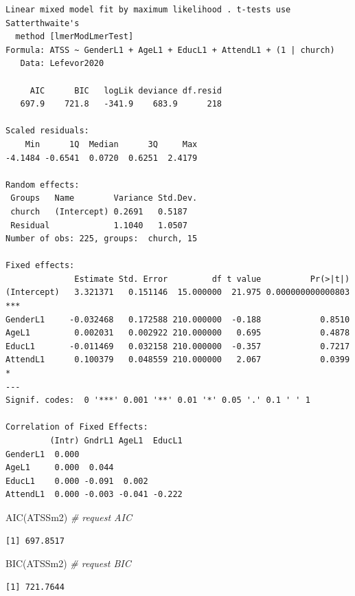 \documentclass[
  english,
]{book}
\newenvironment{Shaded}{\begin{snugshade}}{\end{snugshade}}
\newcommand{\CommentTok}[1]{\textcolor[rgb]{0.56,0.35,0.01}{\textit{#1}}}
\newcommand{\FunctionTok}[1]{\textcolor[rgb]{0.00,0.00,0.00}{#1}}
\newcommand{\NormalTok}[1]{#1}
\begin{document}
\begin{verbatim}
Linear mixed model fit by maximum likelihood . t-tests use Satterthwaite's
  method [lmerModLmerTest]
Formula: ATSS ~ GenderL1 + AgeL1 + EducL1 + AttendL1 + (1 | church)
   Data: Lefevor2020

     AIC      BIC   logLik deviance df.resid 
   697.9    721.8   -341.9    683.9      218 

Scaled residuals: 
    Min      1Q  Median      3Q     Max 
-4.1484 -0.6541  0.0720  0.6251  2.4179 

Random effects:
 Groups   Name        Variance Std.Dev.
 church   (Intercept) 0.2691   0.5187  
 Residual             1.1040   1.0507  
Number of obs: 225, groups:  church, 15

Fixed effects:
              Estimate Std. Error         df t value          Pr(>|t|)    
(Intercept)   3.321371   0.151146  15.000000  21.975 0.000000000000803 ***
GenderL1     -0.032468   0.172588 210.000000  -0.188            0.8510    
AgeL1         0.002031   0.002922 210.000000   0.695            0.4878    
EducL1       -0.011469   0.032158 210.000000  -0.357            0.7217    
AttendL1      0.100379   0.048559 210.000000   2.067            0.0399 *  
---
Signif. codes:  0 '***' 0.001 '**' 0.01 '*' 0.05 '.' 0.1 ' ' 1

Correlation of Fixed Effects:
         (Intr) GndrL1 AgeL1  EducL1
GenderL1  0.000                     
AgeL1     0.000  0.044              
EducL1    0.000 -0.091  0.002       
AttendL1  0.000 -0.003 -0.041 -0.222
\end{verbatim}

\begin{Shaded}
\begin{Highlighting}[]
\FunctionTok{AIC}\NormalTok{(ATSSm2) }\CommentTok{\# request AIC}
\end{Highlighting}
\end{Shaded}

\begin{verbatim}
[1] 697.8517
\end{verbatim}

\begin{Shaded}
\begin{Highlighting}[]
\FunctionTok{BIC}\NormalTok{(ATSSm2) }\CommentTok{\# request BIC}
\end{Highlighting}
\end{Shaded}

\begin{verbatim}
[1] 721.7644
\end{verbatim}
\end{document}
